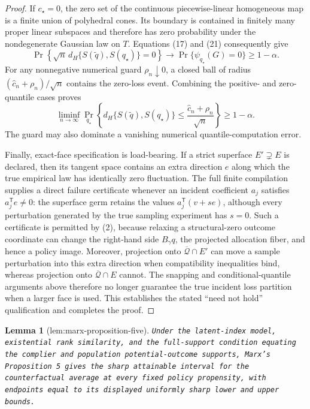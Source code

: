 \documentclass{article}
\newtheorem{lemma}{Lemma}
\begin{document}
\begin{proof}
If \(c_\star=0\), the zero set of the continuous piecewise-linear homogeneous map is a finite union of polyhedral cones.  Its boundary is contained in finitely many proper linear subspaces and therefore has zero probability under the nondegenerate Gaussian law on \(T\).  Equations (17) and (21) consequently give
\[
 \Pr\!\left\{\sqrt n\,d_H\{S(\widetilde q),S(q_\star)\}=0\right\}
 \longrightarrow \Pr\{\psi_{q_\star}(G)=0\}\geq1-\alpha.
\tag{24}
\]
For any nonnegative numerical guard \(\rho_n\downarrow0\), a closed ball of radius \((\widehat c_n+\rho_n)/\sqrt n\) contains the zero-loss event.  Combining the positive- and zero-quantile cases proves
\[
 \liminf_{n\to\infty}\Pr_{q_\star}\!\left\{
 d_H\{S(\widetilde q),S(q_\star)\}
 \leq\frac{\widehat c_n+\rho_n}{\sqrt n}
 \right\}\geq1-\alpha.
\tag{25}
\]
The guard may also dominate a vanishing numerical quantile-computation error.

Finally, exact-face specification is load-bearing.  If a strict superface \(E'\supsetneq E\) is declared, then its tangent space contains an extra direction \(e\) along which the true empirical law has identically zero fluctuation.  The full finite compilation supplies a direct failure certificate whenever an incident coefficient \(a_j\) satisfies \(a_j^{\mathsf T}e\neq0\): the superface germ retains the values \(a_j^{\mathsf T}(v+se)\), although every perturbation generated by the true sampling experiment has \(s=0\).  Such a certificate is permitted by (2), because relaxing a structural-zero outcome coordinate can change the right-hand side \(B_\gamma q\), the projected allocation fiber, and hence a policy image.  Moreover, projection onto \(\overline{\mathcal Q}\cap E'\) can move a sample perturbation into this extra direction when compatibility inequalities bind, whereas projection onto \(\overline{\mathcal Q}\cap E\) cannot.  The snapping and conditional-quantile arguments above therefore no longer guarantee the true incident loss partition when a larger face is used.  This establishes the stated ``need not hold'' qualification and completes the proof.
\end{proof}

\begin{lemma}[lem:marx-proposition-five]\label{lem:marx-proposition-five}
\texttt{Under the latent-\allowbreak{}index model,\allowbreak{} existential rank similarity,\allowbreak{} and the full-\allowbreak{}support condition equating the complier and population potential-\allowbreak{}outcome supports,\allowbreak{} Marx's Proposition 5 gives the sharp attainable interval for the counterfactual average at every fixed policy propensity,\allowbreak{} with endpoints equal to its displayed uniformly sharp lower and upper bounds.}
\end{lemma}
\end{document}

